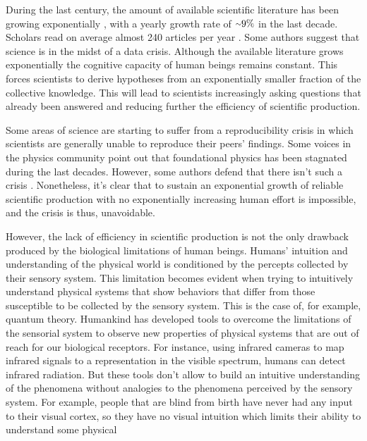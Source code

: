\documentclass[11pt,a4paper,twoside]{report}
\newcommand{\+}{\textnormal{+} }
\theoremstyle{definition}
\numberwithin{equation}{chapter}
\begin{document}
During the last century, the amount of available scientific literature has been
growing exponentially \cite{sinatra2015century,BornmannRudiger}, with a yearly
growth rate of $ {\raise.17ex\hbox{$\scriptstyle\mathtt{\sim}$}} 9\%$ in the
last decade. Scholars read on average almost 240 articles per year
\cite{publications7010018}. Some authors \cite{Alkhateeb} suggest that science
is in the midst of a data crisis. Although the available literature grows
exponentially the cognitive capacity of human beings remains constant. This
forces scientists to derive hypotheses from an exponentially smaller fraction of
the collective knowledge. This will lead to scientists increasingly asking
questions that already been answered and reducing further the efficiency of
scientific production. 

Some areas of science are starting to suffer from a reproducibility crisis
\cite{Saltelli, begley2012raise} in which scientists are generally unable to
reproduce their peers' findings. Some voices in the physics community
\cite{Sabine} point out that foundational physics has been stagnated during the
last decades. However, some authors defend that there isn't such a crisis
\cite{Fanelli2628}. Nonetheless, it's clear that to sustain an exponential
growth of reliable scientific production with no exponentially increasing human
effort is impossible, and the crisis is thus, unavoidable.
 \par
However, the lack of efficiency in scientific production is not the only
drawback produced by the biological limitations of human beings. Humans'
intuition and understanding of the physical world is conditioned by the percepts
collected by their sensory system. This limitation becomes evident when trying
to intuitively understand physical systems that show behaviors that differ from
those susceptible to be collected by the sensory system. This is the case of,
for example, quantum theory. Humankind has developed tools to overcome the
limitations of the sensorial system to observe new properties of physical
systems that are out of reach for our biological receptors. For instance, using
infrared cameras to map infrared signals to a representation in the visible
spectrum, humans can detect infrared radiation. But these tools don't allow to
build an intuitive understanding of the phenomena without analogies to the
phenomena perceived by the sensory system. For example, people that are blind
from birth have never had any input to their visual cortex, so they have no
visual intuition which limits their ability to understand some physical
\end{document}
